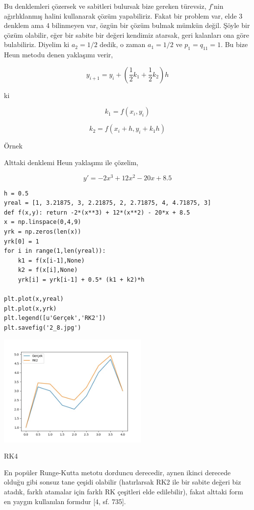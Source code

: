 \documentclass[12pt,fleqn]{article}\usepackage{../../common}
\begin{document}
Bu denklemleri çözersek ve sabitleri bulursak bize gereken türevsiz, $f$'nin
ağırlıklanmış halini kullanarak çözüm yapabiliriz. Fakat bir problem var, elde 3
denklem ama 4 bilinmeyen var, özgün bir çözüm bulmak mümkün değil. Şöyle bir
çözüm olabilir, eğer bir sabite bir değeri kendimiz atarsak, geri kalanları ona
göre bulabiliriz. Diyelim ki $a_2 = 1/2$ dedik, o zaman $a_1 = 1/2$ ve $p_1 =
q_{11} = 1$. Bu bize Heun metodu denen yaklaşımı verir,

$$
y_{i+1} = y_i + \left( \frac{1}{2} k_1 + \frac{1}{2} k_2 \right) h
$$

ki

$$
k_1 = f(x_i,y_i)
$$

$$
k_2 = f(x_i + h, y_i + k_1 h)
$$

Örnek

Alttaki denklemi Heun yaklaşımı ile çözelim,

$$
y' = -2x^3 + 12x^2 - 20x + 8.5
$$

\begin{verbatim}
h = 0.5
yreal = [1, 3.21875, 3, 2.21875, 2, 2.71875, 4, 4.71875, 3]
def f(x,y): return -2*(x**3) + 12*(x**2) - 20*x + 8.5
x = np.linspace(0,4,9)
yrk = np.zeros(len(x))
yrk[0] = 1
for i in range(1,len(yreal)):
    k1 = f(x[i-1],None)
    k2 = f(x[i],None)
    yrk[i] = yrk[i-1] + 0.5* (k1 + k2)*h
    
plt.plot(x,yreal)
plt.plot(x,yrk)
plt.legend([u'Gerçek','RK2'])
plt.savefig('2_8.jpg')
\end{verbatim}

\includegraphics[width=20em]{2_8.jpg}

RK4

En popüler Runge-Kutta metotu dorduncu derecedir, aynen ikinci derecede olduğu
gibi sonsuz tane çeşidi olabilir (hatırlarsak RK2 ile bir sabite değeri biz
atadık, farklı atamalar için farklı RK çeşitleri elde edilebilir), fakat alttaki
form en yaygın kullanılan formdur [4, sf. 735].
\end{document}
